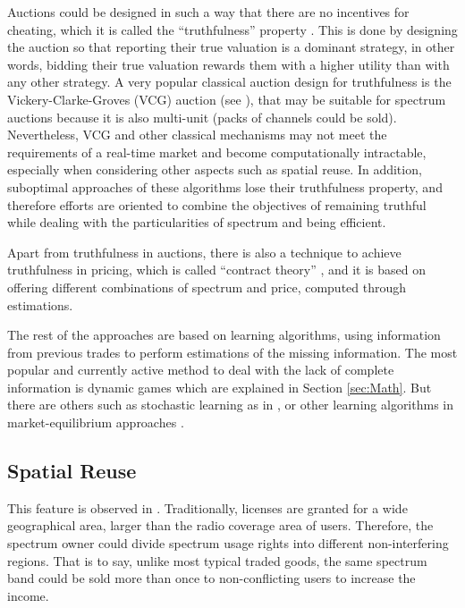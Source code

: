Auctions could be designed in such a way that there are no incentives for cheating, which it is called the ``truthfulness'' property \cite{ref:Zhou2008,ref:Gopinathan2011,ref:Zhu2012,ref:Jia2009_Rev,ref:Zhou2009_TRUST,ref:Wang2010_TODA,ref:Gao2011_MAP}. This is done by designing the auction so that reporting their true valuation is a dominant strategy, in other words, bidding their true valuation rewards them with a higher utility than with any other strategy. A very popular classical auction design for truthfulness is the Vickery-Clarke-Groves (VCG) auction (see \cite{ref:Yu2011_Cog}), that may be suitable for spectrum auctions because it is also multi-unit (packs of channels could be sold). Nevertheless, VCG and other classical mechanisms may not meet the requirements of a real-time market and become computationally intractable, especially when considering other aspects such as spatial reuse. In addition, suboptimal approaches of these algorithms lose their truthfulness property, and therefore efforts are oriented to combine the objectives of remaining truthful while dealing with the particularities of spectrum and being efficient. 

Apart from truthfulness in auctions, there is also a technique to achieve truthfulness in pricing, which is called ``contract theory'' \cite{ref:Duan2011_Contract,ref:Gao2011}, and it is based on offering different combinations of spectrum and price, computed through estimations. 

The rest of the approaches are based on learning algorithms, using information from previous trades to perform estimations of the missing information. The most popular and currently active method to deal with the lack of complete information is dynamic games \cite{ref:Niyato2007_Game,ref:Jia2008_com,ref:Niyato2008_Comp,ref:Zhu2012_Dyn,ref:Dixit2010,ref:Niyato2009_Dyn,ref:Ji2008,ref:Dixit2010} which are explained in Section \ref{sec:Math}. But there are others such as stochastic learning as in \cite{ref:Xing2007}, or other learning algorithms in market-equilibrium approaches \cite{ref:Niyato2007_Hier,ref:Niyato2007_Eq,ref:Niyato2008_Mark,ref:Niyato2008_Spec,ref:Niyato2010}. 

\subsection{Spatial Reuse}
\label{subsec:Spatial} 
This feature is observed in \cite{ref:Zhou2008,ref:Gopinathan2011,ref:Zhu2012,ref:Kaskebar2012,ref:Xu2011,ref:Gandhi2008}. Traditionally, licenses are granted for a wide geographical area, larger than the radio coverage area of users. Therefore, the spectrum owner could divide spectrum usage rights into different non-interfering regions. That is to say, unlike most typical traded goods, the same spectrum band could be sold more than once to non-conflicting users to increase the income.

